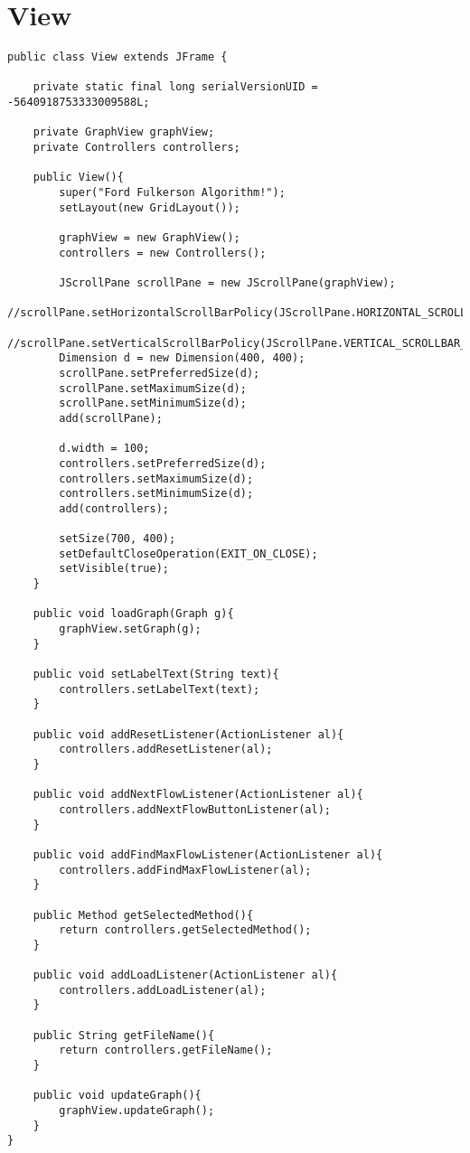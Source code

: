 \chapter{View}
\lstset{language=Java}
\begin{lstlisting}[caption=View Source Code]
public class View extends JFrame {

	private static final long serialVersionUID = -5640918753333009588L;
	
	private GraphView graphView;
	private Controllers controllers;
	
	public View(){
		super("Ford Fulkerson Algorithm!");
		setLayout(new GridLayout());
		
		graphView = new GraphView();
		controllers = new Controllers();
		
		JScrollPane scrollPane = new JScrollPane(graphView);
		//scrollPane.setHorizontalScrollBarPolicy(JScrollPane.HORIZONTAL_SCROLLBAR_ALWAYS);
		//scrollPane.setVerticalScrollBarPolicy(JScrollPane.VERTICAL_SCROLLBAR_ALWAYS);
		Dimension d = new Dimension(400, 400);
		scrollPane.setPreferredSize(d);
		scrollPane.setMaximumSize(d);
		scrollPane.setMinimumSize(d);
		add(scrollPane);
		
		d.width = 100;
		controllers.setPreferredSize(d);
		controllers.setMaximumSize(d);
		controllers.setMinimumSize(d);
		add(controllers);
		
		setSize(700, 400);
		setDefaultCloseOperation(EXIT_ON_CLOSE);
		setVisible(true);
	}
	
	public void loadGraph(Graph g){
		graphView.setGraph(g);
	}
	
	public void setLabelText(String text){
		controllers.setLabelText(text);
	}
	
	public void addResetListener(ActionListener al){
		controllers.addResetListener(al);
	}
	
	public void addNextFlowListener(ActionListener al){
		controllers.addNextFlowButtonListener(al);
	}
	
	public void addFindMaxFlowListener(ActionListener al){
		controllers.addFindMaxFlowListener(al);
	}
	
	public Method getSelectedMethod(){
		return controllers.getSelectedMethod();
	}
	
	public void addLoadListener(ActionListener al){
		controllers.addLoadListener(al);
	}
	
	public String getFileName(){
		return controllers.getFileName();
	}
	
	public void updateGraph(){
		graphView.updateGraph();
	}
}
\end{lstlisting}